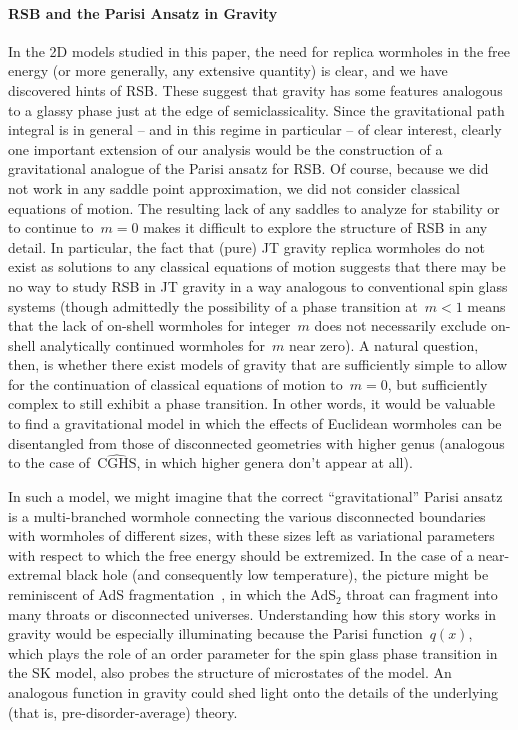 \documentclass[12pt]{article}
\begin{document}
\paragraph{RSB and the Parisi Ansatz in Gravity} In the 2D models studied in this paper, the need for replica wormholes in the free energy (or more generally, any extensive quantity) is clear, and we have discovered hints of RSB.  These suggest that gravity has some features analogous to a glassy phase just at the edge of semiclassicality.  Since the gravitational path integral is in general -- and in this regime in particular -- of clear interest, clearly one important extension of our analysis would be the construction of a gravitational analogue of the Parisi ansatz for RSB.  Of course, because we did not work in any saddle point approximation, we did not consider classical equations of motion.  The resulting lack of any saddles to analyze for stability or to continue to~$m = 0$ makes it difficult to explore the structure of RSB in any detail.  In particular, the fact that (pure) JT gravity replica wormholes do not exist as solutions to any classical equations of motion suggests that there may be no way to study RSB in JT gravity in a way analogous to conventional spin glass systems (though admittedly the possibility of a phase transition at~$m < 1$ means that the lack of on-shell wormholes for integer~$m$ does not necessarily exclude on-shell analytically continued wormholes for~$m$ near zero).  A natural question, then, is whether there exist models of gravity that are sufficiently simple to allow for the continuation of classical equations of motion to~$m = 0$, but sufficiently complex to still exhibit a phase transition.  In other words, it would be valuable to find a gravitational model in which the effects of Euclidean wormholes can be disentangled from those of disconnected geometries with higher genus (analogous to the case of~$\widehat{\mathrm{CGHS}}$, in which higher genera don't appear at all).

In such a model, we might imagine that the correct ``gravitational'' Parisi ansatz is a multi-branched wormhole connecting the various disconnected boundaries with wormholes of different sizes, with these sizes left as variational parameters with respect to which the free energy should be extremized.  In the case of a near-extremal black hole (and consequently low temperature), the picture might be reminiscent of AdS fragmentation~\cite{MalMic98}, in which the AdS$_2$ throat can fragment into many throats or disconnected universes.  Understanding how this story works in gravity would be especially illuminating because the Parisi function~$q(x)$, which plays the role of an order parameter for the spin glass phase transition in the SK model, also probes the structure of microstates of the model.  An analogous function in gravity could shed light onto the details of the underlying (that is, pre-disorder-average) theory.
\end{document}
